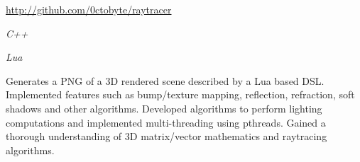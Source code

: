 \documentclass{article}
\newenvironment{name}{\fontfamily{phv}\selectfont\bfseries\normalsize}{\par}
\newenvironment{colorheading}{\fontfamily{phv}\selectfont\bfseries\normalsize\color{darkcyan}}{\par}
\newenvironment{genericbody}{\fontfamily{phv}\selectfont\small\raggedright}{\par}
\newenvironment{metadata}{\fontfamily{phv}\selectfont\itshape\small\color{darkgray}}{\par}
\newenvironment{experience}[2]%
{%
  \begin{minipage}{0.6\linewidth}\begin{flushleft}#1\end{flushleft}\end{minipage}%
  \hfill%
  \begin{minipage}{0.3\linewidth}\begin{flushright}#2\end{flushright}\end{minipage}%
}%
{}
\begin{document}
\begin{minipage}[t]{0.6\linewidth}
\begin{experience}
{      \begin{genericbody}\url{http://github.com/0ctobyte/raytracer}\end{genericbody}
    }
    {
      \begin{metadata}C++\end{metadata}
      \begin{metadata}Lua\end{metadata}
    }
    \end{experience}
    \begin{genericbody}
      Generates a PNG of a 3D rendered scene described by a Lua based DSL. Implemented features such as bump/texture
      mapping, reflection, refraction, soft shadows and other algorithms. Developed algorithms to perform lighting
      computations and implemented multi-threading using pthreads. Gained a thorough understanding of 3D matrix/vector
      mathematics and raytracing algorithms.
    \end{genericbody}
  \end{minipage}
\end{document}
